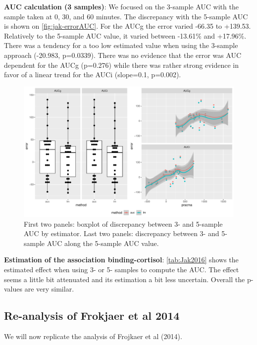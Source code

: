 \documentclass[12pt]{article}
\begin{document}
\textbf{AUC calculation (3 samples)}: We focused on the 3-sample AUC with the
sample taken at 0, 30, and 60 minutes. The discrepancy with the
5-sample AUC is shown on \autoref{fig:jak-errorAUC}. For the AUCg the
error varied -66.35 to +139.53. Relatively to the 5-sample AUC value,
it varied between -13.61\% and +17.96\%. There was a tendency for a too
low estimated value when using the 3-sample approach (-20.983,
p=0.0339). There was no evidence that the error was AUC dependent for
the AUCg (p=0.276) while there was rather strong evidence in favor of
a linear trend for the AUCi (slope=0.1, p=0.002). 

\begin{figure}[!h]
\centering
\includegraphics[width=1\textwidth]{./figures/gg-jak-errorAUC.pdf}
\caption{\label{fig:jak-errorAUC}First two panels: boxplot of discrepancy between 3- and 5-sample AUC by estimator. Last two panels: discrepancy between 3- and 5-sample AUC along the 5-sample AUC value.}
\end{figure}

\bigskip

\textbf{Estimation of the association binding-cortisol}: \autoref{tab:Jak2016} shows
the estimated effect when using 3- or 5- samples to compute the
AUC. The effect seems a little bit attenuated and its estimation a bit
less uncertain. Overall the p-values are very similar.

\subsection{Re-analysis of Frokjaer et al 2014}
\label{sec:org9183b88}

We will now replicate the analysis of Frojkaer et al (2014).
\end{document}

